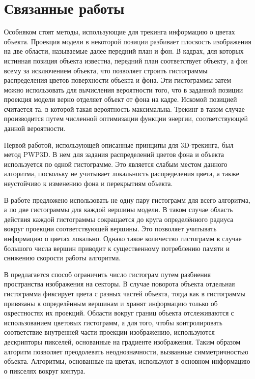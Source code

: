 \section{Связанные работы}\label{related-work}


Особняком стоят методы, использующие для трекинга информацию о цветах объекта.
Проекция модели в некоторой позиции разбивает плоскость изображения на две
области, называемые далее передний план и фон.
В кадрах, для которых истинная позиция объекта известна, передний план
соответствует объекту, а фон всему за исключением объекта, что позволяет
строить гистограммы распределения цветов поверхности объекта и фона.
Эти гистограммы затем можно использовать для вычисления вероятности того, что в
заданной позиции проекция модели верно отделяет объект от фона на кадре.
Искомой позицией считается та, в которой такая вероятность максимальна.
Трекинг в таком случае производится путем численной оптимизации функции
энергии, соответствующей данной вероятности.

Первой работой, использующей описанные принципы для 3D-трекинга,
был метод PWP3D\cite{PWP3D}.
В нем для задания распределений цветов фона и объекта используется по одной
гистограмме.
Это является слабым местом данного алгоритма, поскольку не учитывает
локальность распределения цвета, а также неустойчиво к изменению фона
и перекрытиям объекта.

В работе \cite{Tjaden2017} предложено использовать не одну пару гистограмм для
всего алгоритма, а по две гистограммы для каждой вершины модели.
В таком случае область действия каждой гистограммы сокращается до круга
определённого радиуса вокруг проекции соответствующей вершины.
Это позволяет учитывать информацию о цветах локально.
Однако такое количество гистограмм в случае большого числа вершин приводит к
существенному потреблению памяти и снижению скорости работы алгоритма.

В \cite{RegionPhotometric} предлагается способ ограничить число гистограм
путем разбиения пространства изображения на секторы.
В случае поворота объекта отдельная гистограмма фиксирует цвета с разных частей
объекта, тогда как в \cite{Tjaden2017} гистограммы привязаны к определённым
вершинам и хранят информацию только об окрестностях их проекций.
Области вокруг границ объекта отслеживаются с использованием цветовых
гистограмм, а для того, чтобы контролировать соответствие внутренней части
проекции изображению, используются дескрипторы пикселей, основанные на
градиенте изображения.
Таким образом алгоритм позволяет преодолевать неоднозначности, вызванные
симметричностью объекта.
Алгоритмы, основанные на цветах, используют в основном информацию о пикселях
вокруг контура.
